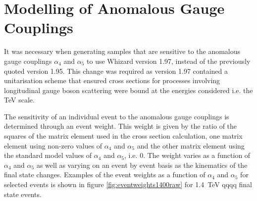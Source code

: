 \section{Modelling of Anomalous Gauge Couplings}
\label{sec:modellingofanomalouscouplings}
It was necessary when generating samples that are sensitive to the anomalous gauge couplings $\alpha_{4}$ and $\alpha_{5}$ to use Whizard version 1.97, instead of the previously quoted version 1.95.  This change was required as version 1.97 contained a unitarisation scheme that ensured cross sections for processes involving longitudinal gauge boson scattering were bound at the energies considered i.e. the TeV scale.  

The sensitivity of an individual event to the anomalous gauge couplings is determined through an event weight. This weight is given by the ratio of the squares of the matrix element used in the cross section calculation, one matrix element using non-zero values of $\alpha_{4}$ and $\alpha_{5}$ and the other matrix element using the standard model values of $\alpha_{4}$ and $\alpha_{5}$, i.e. 0.  The weight varies as a function of $\alpha_{4}$ and $\alpha_{5}$ as well as varying on an event by event basis as the kinematics of the final state changes.  Examples of the event weights as a function of $\alpha_{4}$ and $\alpha_{5}$ for selected events is shown in figure \ref{fig:eventweights1400raw} for 1.4~TeV \nu{\nu}qqqq final state events.

